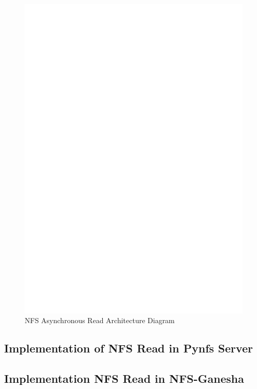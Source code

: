 \begin{figure}
\centering
\includegraphics[scale=0.7]{figures/AsyncRead.eps}
\caption{NFS Asynchronous Read Architecture Diagram}
\label{fig:NFSAsyncReadArch}
\end{figure}

\subsection{Implementation of NFS Read in Pynfs Server}


\subsection{Implementation NFS Read in NFS-Ganesha}

